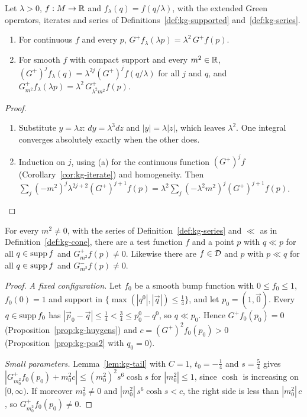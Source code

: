 \begin{extra}
\begin{lemma}[Dilation]\label{lem:kg-dil}
Let $\lambda>0$, $f:M\to\mathbb R$ and $f_\lambda(q)=f(q/\lambda)$, with the extended Green operators, iterates and series of
Definitions~\ref{def:kg-supported} and~\ref{def:kg-series}.
\begin{enumerate}[label=(\alph*),leftmargin=2.5em]
\item For continuous $f$ and every $p$, $G^+f_\lambda(\lambda p)=\lambda^2\,G^+f(p)$.
\item For smooth $f$ with compact support and every $m^2\in\mathbb R$,
$(G^+)^jf_\lambda(q)=\lambda^{2j}(G^+)^jf(q/\lambda)$ for all $j$ and $q$, and
$G^+_{m^2}f_\lambda(\lambda p)=\lambda^2\,G^+_{\lambda^2m^2}f(p)$.
\end{enumerate}
\end{lemma}
\begin{proof}
\begin{enumerate}[leftmargin=2.5em]
\item[(a)] Substitute $y=\lambda z$: $dy=\lambda^3dz$ and $|y|=\lambda|z|$, which leaves $\lambda^2$. One
integral converges absolutely exactly when the other does.
\item[(b)] Induction on $j$, using (a) for the continuous function $(G^+)^jf$
(Corollary~\ref{cor:kg-iterate}) and homogeneity. Then
$\sum_j(-m^2)^j\lambda^{2j+2}(G^+)^{j+1}f(p)=\lambda^2\sum_j(-\lambda^2m^2)^j(G^+)^{j+1}f(p)$.
\end{enumerate}
\end{proof}

\begin{theorem}\label{thm:kg-fail}
For every $m^2\neq0$, with the series of Definition~\ref{def:kg-series} and $\ll$ as in
Definition~\ref{def:kg-cone}, there are a test function $f$ and a point $p$ with $q\ll p$ for all
$q\in\operatorname{supp} f$ and $G^+_{m^2}f(p)\ne0$. Likewise there are $f\in\mathcal D$ and $p$ with $p\ll q$ for all
$q\in\operatorname{supp} f$ and $G^-_{m^2}f(p)\neq0$.
\end{theorem}
\begin{proof}
\emph{A fixed configuration.} Let $f_0$ be a smooth bump function with $0\le f_0\le1$, $f_0(0)=1$ and
support in $\{\max(|q^0|,|\vec q|)\le\tfrac14\}$, and let $p_0=(1,\vec0)$. Every $q\in\operatorname{supp} f_0$ has
$|\vec p_0-\vec q|\le\tfrac14<\tfrac34\le p_0^0-q^0$, so $q\ll p_0$. Hence $G^+f_0(p_0)=0$
(Proposition~\ref{prop:kg-huygens}) and $c=(G^+)^2f_0(p_0)>0$ (Proposition~\ref{prop:kg-pos2} with
$q_0=0$).

\emph{Small parameters.} Lemma~\ref{lem:kg-tail} with $C=1$, $t_0=-\tfrac14$ and $s=\tfrac54$ gives
$|G^+_{m_0^2}f_0(p_0)+m_0^2c|\le(m_0^2)^2s^6\cosh s$ for $|m_0^2|\le1$, since $\cosh$ is increasing
on $[0,\infty)$. If moreover $m_0^2\ne0$ and $|m_0^2|\,s^6\cosh s<c$, the right side is less than
$|m_0^2|\,c$, so $G^+_{m_0^2}f_0(p_0)\ne0$.


\end{proof}
\end{extra}
